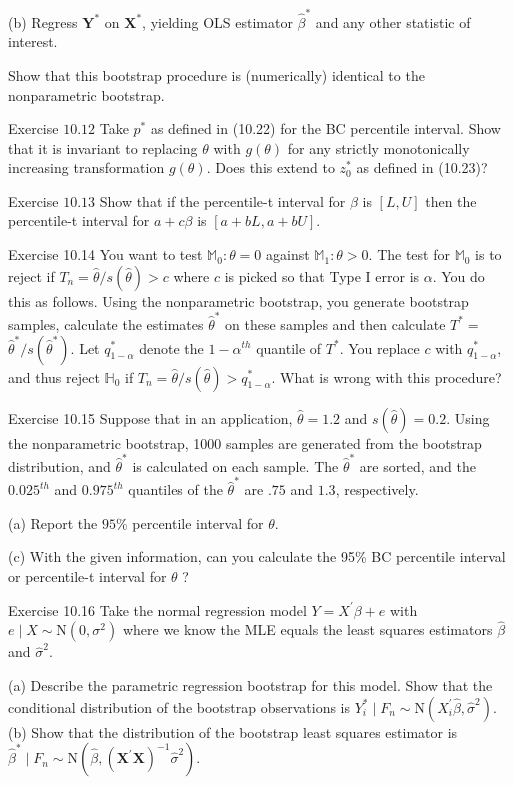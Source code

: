 \documentclass[10pt]{article}
\begin{document}
(b) Regress $\boldsymbol{Y}^{*}$ on $\boldsymbol{X}^{*}$, yielding OLS estimator $\widehat{\beta}^{*}$ and any other statistic of interest.

Show that this bootstrap procedure is (numerically) identical to the nonparametric bootstrap.

Exercise $10.12$ Take $p^{*}$ as defined in (10.22) for the BC percentile interval. Show that it is invariant to replacing $\theta$ with $g(\theta)$ for any strictly monotonically increasing transformation $g(\theta)$. Does this extend to $z_{0}^{*}$ as defined in (10.23)?

Exercise $10.13$ Show that if the percentile-t interval for $\beta$ is $[L, U]$ then the percentile-t interval for $a+c \beta$ is $[a+b L, a+b U]$.

Exercise 10.14 You want to test $\mathbb{M}_{0}: \theta=0$ against $\mathbb{M}_{1}: \theta>0$. The test for $\mathbb{M}_{0}$ is to reject if $T_{n}=\widehat{\theta} / s(\widehat{\theta})>c$ where $c$ is picked so that Type I error is $\alpha$. You do this as follows. Using the nonparametric bootstrap, you generate bootstrap samples, calculate the estimates $\widehat{\theta}^{*}$ on these samples and then calculate $T^{*}=$ $\widehat{\theta}^{*} / s\left(\widehat{\theta}^{*}\right)$. Let $q_{1-\alpha}^{*}$ denote the $1-\alpha^{t h}$ quantile of $T^{*}$. You replace $c$ with $q_{1-\alpha}^{*}$, and thus reject $\mathbb{H}_{0}$ if $T_{n}=\widehat{\theta} / s(\widehat{\theta})>q_{1-\alpha}^{*}$. What is wrong with this procedure?

Exercise 10.15 Suppose that in an application, $\widehat{\theta}=1.2$ and $s(\widehat{\theta})=0.2$. Using the nonparametric bootstrap, 1000 samples are generated from the bootstrap distribution, and $\widehat{\theta}^{*}$ is calculated on each sample. The $\widehat{\theta}^{*}$ are sorted, and the $0.025^{t h}$ and $0.975^{t h}$ quantiles of the $\widehat{\theta}^{*}$ are $.75$ and $1.3$, respectively.

(a) Report the $95 \%$ percentile interval for $\theta$.

(c) With the given information, can you calculate the 95\% BC percentile interval or percentile-t interval for $\theta$ ?

Exercise 10.16 Take the normal regression model $Y=X^{\prime} \beta+e$ with $e \mid X \sim \mathrm{N}\left(0, \sigma^{2}\right)$ where we know the MLE equals the least squares estimators $\widehat{\beta}$ and $\widehat{\sigma}^{2}$.

(a) Describe the parametric regression bootstrap for this model. Show that the conditional distribution of the bootstrap observations is $Y_{i}^{*} \mid F_{n} \sim \mathrm{N}\left(X_{i}^{\prime} \widehat{\beta}, \widehat{\sigma}^{2}\right)$. (b) Show that the distribution of the bootstrap least squares estimator is $\widehat{\beta}^{*} \mid F_{n} \sim \mathrm{N}\left(\widehat{\beta},\left(\boldsymbol{X}^{\prime} \boldsymbol{X}\right)^{-1} \widehat{\sigma}^{2}\right)$.
\end{document}
